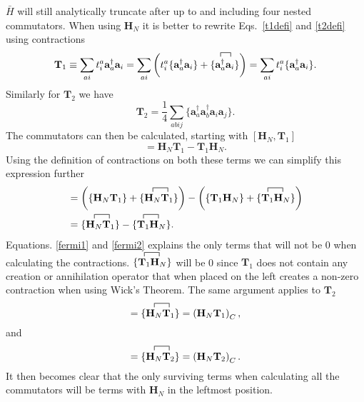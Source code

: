 \documentclass[a4paper,norsk,11pt,twoside]{report}
\begin{document}
$\bar{H}$ will still analytically truncate after up to and including four nested commutators. When using $\textbf{H}_N$ it is better to rewrite Eqs.~\eqref{t1defi} and \eqref{t2defi} using contractions
\begin{equation}
\textbf{T}_1 \equiv \sum_{ai} t_i^a \textbf{a}^{\dag}_a \textbf{a}_i = \sum_{ai} \left( t_i^a \{\textbf{a}^{\dag}_a \textbf{a}_i\} + \{
\contraction{}{\textbf{a}^{\dag}_a}{}{\textbf{a}_i}
\textbf{a}^{\dag}_a \textbf{a}_i
\} \right) = \sum_{ai} t_i^a \{\textbf{a}^{\dag}_a \textbf{a}_i\} .
\end{equation}
Similarly for $\textbf{T}_2$ we have
\begin{equation}
\textbf{T}_2 = \frac{1}{4} \sum_{abij} \{
\textbf{a}^{\dag}_a \textbf{a}^{\dag}_b
\textbf{a}_i \textbf{a}_j \} .
\end{equation}
The commutators can then be calculated, starting with $[\textbf{H}_N, \textbf{T}_1]$
\begin{equation}
[\textbf{H}_N, \textbf{T}_1] = \textbf{H}_N \textbf{T}_1 - \textbf{T}_1 \textbf{H}_N .
\end{equation}
Using the definition of contractions on both these terms we can simplify this expression further
\begin{align}
[\textbf{H}_N, \textbf{T}_1] & =
\left( \{\textbf{H}_N\textbf{T}_1\} + \{
\contraction{}{\textbf{H}_N}{}{\textbf{T}_1}
\textbf{H}_N\textbf{T}_1\} \right) - \left(\{\textbf{T}_1\textbf{H}_N\} + \{
\contraction{}{\textbf{T}_1}{}{\textbf{H}_N}
\textbf{T}_1\textbf{H}_N\} \right) \nonumber \\ &
= \{
\contraction{}{\textbf{H}_N}{}{\textbf{T}_1}
\textbf{H}_N\textbf{T}_1\}
- \{
\contraction{}{\textbf{T}_1}{}{\textbf{H}_N}
\textbf{T}_1\textbf{H}_N\} .
\end{align}
Equations. \eqref{fermi1} and \eqref{fermi2} explains the only terms
that will not be 0 when calculating the contractions. $\{
\contraction{}{\textbf{T}_1}{}{\textbf{H}_N}
\textbf{T}_1\textbf{H}_N\}$ will be 0 since $\textbf{T}_1$ does not
contain any creation or annihilation operator that when placed on the
left creates a non-zero contraction when using Wick's Theorem. The
same argument applies to $\textbf{T}_2$
\begin{equation}
[\textbf{H}_N, \textbf{T}_1] = 
\{
\contraction{}{\textbf{H}_N}{}{\textbf{T}_1}
\textbf{H}_N\textbf{T}_1\} 
= \left( \textbf{H}_N \textbf{T}_1 \right)_C,
\end{equation}
and
\begin{equation}
[\textbf{H}_N, \textbf{T}_2] = 
\{
\contraction{}{\textbf{H}_N}{}{\textbf{T}_2}
\textbf{H}_N\textbf{T}_2\} 
= \left( \textbf{H}_N \textbf{T}_2 \right)_C
.
\end{equation}
It then becomes clear that the only surviving terms when calculating all the commutators will be terms with $\textbf{H}_N$ in the leftmost position. \\
\end{document}

